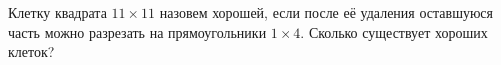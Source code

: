 Клетку квадрата $11 \times 11$ назовем хорошей, если после её удаления оставшуюся часть можно разрезать на прямоугольники $1 \times 4$. Сколько существует хороших клеток?